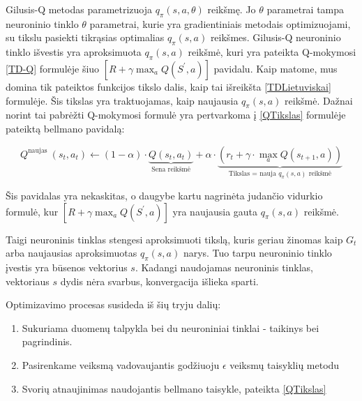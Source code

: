 \documentclass[a4paper, 12pt]{article}
\begin{document}
Gilusis-Q metodas parametrizuoja $q_{\pi}(s, a, \theta)$ reikšmę. Jo $\theta$ parametrai tampa neuroninio tinklo $\theta$ parametrai, kurie yra gradientiniais metodais optimizuojami, su tikslu pasiekti tikrąsias optimalias $q_{\pi}(s, a)$ reikšmes. Gilusis-Q neuroninio tinklo išvestis yra aproksimuota $q_{\pi}(s, a)$ reikšmė, kuri yra pateikta Q-mokymosi \ref{TD-Q} formulėje šiuo $\left[R+\gamma \max _{a} Q\left(S^{\prime}, a\right)\right]$ pavidalu. Kaip matome, mus domina tik pateiktos funkcijos tikslo dalis, kaip tai išreikšta \ref{TDLietuviskai} formulėje. Šis tikslas yra traktuojamas, kaip naujausia $q_{\pi}(s, a)$ reikšmė. Dažnai norint tai pabrėžti Q-mokymosi formulė yra pertvarkoma į \ref{QTikslas} formulėje pateiktą bellmano pavidalą:

\begin{equation}
\label{QTikslas}
Q^{\text {naujas }}\left(s_{t}, a_{t}\right) \leftarrow(1-\alpha) \cdot \underbrace{Q\left(s_{t}, a_{t}\right)}_{\text{Sena reikšmė}}+\alpha \cdot\underbrace{(r_{t}+\gamma \cdot \max _{a} Q\left(s_{t+1}, a\right))}_{\text{Tikslas = nauja $q_{\pi}(s, a)$ reikšmė}}
\end{equation} 


Šis pavidalas yra nekaskitas, o daugybe kartu nagrinėta judančio vidurkio formulė, kur $\left[R+\gamma \max _{a} Q\left(S^{\prime}, a\right)\right]$ yra naujausia gauta $q_{\pi}(s, a)$ reikšmė.

Taigi neuroninis tinklas stengesi aproksimuoti tikslą, kuris geriau žinomas kaip $G_t$ arba naujausias aproksimuotas $q_{\pi}(s, a)$ narys. Tuo tarpu neuroninio tinklo įvestis yra būsenos vektorius $s$. Kadangi naudojamas neuroninis tinklas, vektoriaus $s$ dydis nėra svarbus, konvergacija išlieka sparti. 

Optimizavimo procesas susideda iš šių tryju dalių:

\begin{enumerate}
  \addtolength{\itemsep}{-0.5\baselineskip} 
  \item Sukuriama duomenų talpykla bei du neuroniniai tinklai - taikinys bei pagrindinis.
  \item Pasirenkame veiksmą vadovaujantis godžiuoju $\epsilon$ veiksmų taisyklių metodu
  \item Svorių atnaujinimas naudojantis bellmano taisykle, pateikta \ref{QTikslas}
\end{enumerate}
\end{document}

